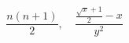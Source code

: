 \documentclass{article}
\begin{document}
\thispagestyle{empty}
\[ \frac{n(n+1)}{2}, \quad \frac{\frac{\sqrt{x}+1}{2}-x}{y^2} \]
\end{document}
